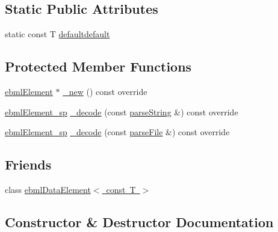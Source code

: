 \subsection*{Static Public Attributes}
\begin{DoxyCompactItemize}
\item 
static const T \mbox{\hyperlink{classebml_1_1ebmlDataElementClass_3_01const_01T_01_4_a4b0000068ea1cd6b05a45b038e47c436}{defaultdefault}}
\end{DoxyCompactItemize}
\subsection*{Protected Member Functions}
\begin{DoxyCompactItemize}
\item 
\mbox{\hyperlink{classebml_1_1ebmlElement}{ebml\+Element}} $\ast$ \mbox{\hyperlink{classebml_1_1ebmlDataElementClass_3_01const_01T_01_4_aaf6b66092e1987919e277661b62f2d90}{\+\_\+new}} () const override
\item 
\mbox{\hyperlink{namespaceebml_adad533b7705a16bb360fe56380c5e7be}{ebml\+Element\+\_\+sp}} \mbox{\hyperlink{classebml_1_1ebmlDataElementClass_3_01const_01T_01_4_a0f8a6e30cd3cc630950a780a726849a7}{\+\_\+decode}} (const \mbox{\hyperlink{classebml_1_1parseString}{parse\+String}} \&) const override
\item 
\mbox{\hyperlink{namespaceebml_adad533b7705a16bb360fe56380c5e7be}{ebml\+Element\+\_\+sp}} \mbox{\hyperlink{classebml_1_1ebmlDataElementClass_3_01const_01T_01_4_a472912867198ebff97d963cdd7f5ce33}{\+\_\+decode}} (const \mbox{\hyperlink{classebml_1_1parseFile}{parse\+File}} \&) const override
\end{DoxyCompactItemize}
\subsection*{Friends}
\begin{DoxyCompactItemize}
\item 
class \mbox{\hyperlink{classebml_1_1ebmlDataElementClass_3_01const_01T_01_4_a2cbdad6043a14b5d01294e19181e831c}{ebml\+Data\+Element$<$ const T $>$}}
\end{DoxyCompactItemize}


\subsection{Constructor \& Destructor Documentation}
\mbox{\label{classebml_1_1ebmlDataElementClass_3_01const_01T_01_4_ad773b2b4c45bcb51ebfcba12d4888de2}} 
